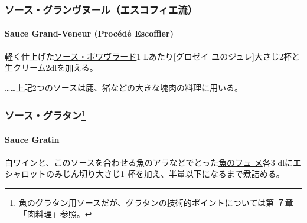 \hypertarget{ux30bdux30fcux30b9ux30b0ux30e9ux30f3ux30f4ux30ccux30fcux30ebux30a8ux30b9ux30b3ux30d5ux30a3ux30a8ux6d41}{%
\subsubsection{ソース・グランヴヌール（エスコフィエ流）}\label{ux30bdux30fcux30b9ux30b0ux30e9ux30f3ux30f4ux30ccux30fcux30ebux30a8ux30b9ux30b3ux30d5ux30a3ux30a8ux6d41}}

\hypertarget{sauce-grand-veneur-procede-escoffier}{%
\paragraph{Sauce Grand-Veneur (Procédé
Escoffier)}\label{sauce-grand-veneur-procede-escoffier}}

  

軽く仕上げた\protect\hyperlink{sauce-poivrade}{ソース・ポワヴラード}1
Lあたり{[}グロゼイ
ユのジュレ{]}大さじ2杯と生クリーム2\undemi{}dlを加える。

\ldots{}\ldots{}上記2つのソースは鹿、猪などの大きな塊肉の料理に用いる。

\maeaki

\hypertarget{ux30bdux30fcux30b9ux30b0ux30e9ux30bfux30f345}{%
\subsubsection[ソース・グラタン]{\texorpdfstring{ソース・グラタン\footnote{魚のグラタン用ソースだが、グラタンの技術的ポイントについては第
  ７章「肉料理」参照。}}{ソース・グラタン}}\label{ux30bdux30fcux30b9ux30b0ux30e9ux30bfux30f345}}

\hypertarget{sauce-gratin}{%
\paragraph{Sauce Gratin}\label{sauce-gratin}}

  

白ワインと、このソースを合わせる魚のアラなどでとった\href{fumet-de-poisson}{魚のフュ
メ}各3 dlにエシャロットのみじん切り大さじ1\undemi{}
杯を加え、半量以下になるまで煮詰める。

